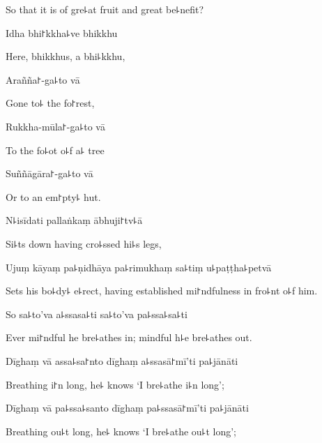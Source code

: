 \begin{english}
  So that it is of gre꜕at fruit and great be꜕nefit?
\end{english}

Idha bhi꜓kkha꜕ve bhikkhu

\begin{english}
  Here, bhikkhus, a bhi꜕kkhu,
\end{english}

Arañña꜓-ga꜕to vā

\begin{english}
  Gone to꜕ the fo꜓rest,
\end{english}

Rukkha-mūla꜓-ga꜕to vā

\begin{english}
  To the fo꜕ot o꜕f a꜕ tree
\end{english}

Suññāgāra꜓-ga꜕to vā

\begin{english}
  Or to an em꜓pty꜕ hut.
\end{english}

N꜕isīdati pallaṅkaṃ ābhuji꜓tv꜕ā

\begin{english}
  Si꜕ts down having cro꜕ssed hi꜕s legs,
\end{english}

Ujuṃ kāyaṃ pa꜕ṇidhāya pa꜕rimukhaṃ sa꜕tiṃ u꜕paṭṭha꜕petvā

\begin{english}
  Sets his bo꜕dy꜕ e꜕rect, having established mi꜓ndfulness in fro꜕nt o꜕f him.
\end{english}

So sa꜕to'va a꜕ssasa꜕ti sa꜕to'va pa꜕ssa꜕sa꜕ti

\begin{english}
  Ever mi꜓ndful he bre꜕athes in; mindful h꜕e bre꜕athes out.
\end{english}

Dīghaṃ vā assa꜕sa꜓nto dīghaṃ a꜕ssasā꜓mī'ti pa꜕jānāti

\begin{english}
  Breathing i꜓n long, he꜕ knows `I bre꜕athe i꜕n long';
\end{english}

Dīghaṃ vā pa꜕ssa꜕santo dīghaṃ pa꜕ssasā꜓mī'ti pa꜕jānāti

\begin{english}
  Breathing ou꜕t long, he꜕ knows `I bre꜕athe ou꜕t long';
\end{english}

